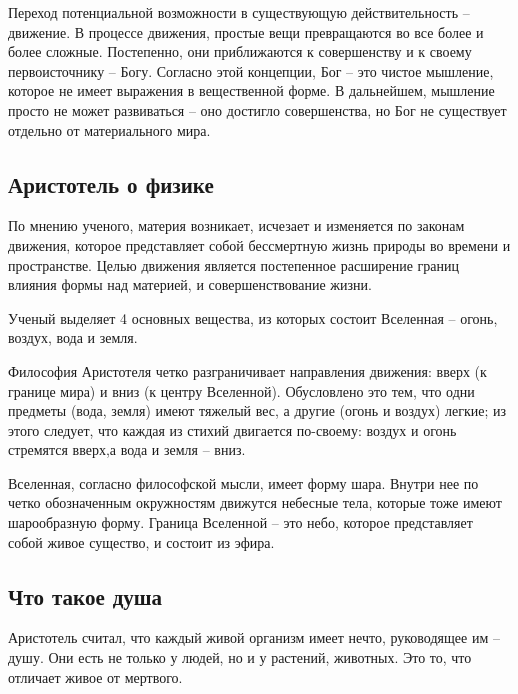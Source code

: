 \documentclass[
]{article}
\begin{document}
Переход потенциальной возможности в существующую действительность --
движение. В процессе движения, простые вещи превращаются во все более и
более сложные. Постепенно, они приближаются к совершенству и к своему
первоисточнику -- Богу. Согласно этой концепции, Бог -- это чистое
мышление, которое не имеет выражения в вещественной форме. В дальнейшем,
мышление просто не может развиваться -- оно достигло совершенства, но
Бог не существует отдельно от материального мира.

\hypertarget{ux430ux440ux438ux441ux442ux43eux442ux435ux43bux44c-ux43e-ux444ux438ux437ux438ux43aux435}{%
\subsection{Аристотель о
физике}\label{ux430ux440ux438ux441ux442ux43eux442ux435ux43bux44c-ux43e-ux444ux438ux437ux438ux43aux435}}

По мнению ученого, материя возникает, исчезает и изменяется по законам
движения, которое представляет собой бессмертную жизнь природы во
времени и пространстве. Целью движения является постепенное расширение
границ влияния формы над материей, и совершенствование жизни.

Ученый выделяет 4 основных вещества, из которых состоит Вселенная --
огонь, воздух, вода и земля.

Философия Аристотеля четко разграничивает направления движения: вверх (к
границе мира) и вниз (к центру Вселенной). Обусловлено это тем, что одни
предметы (вода, земля) имеют тяжелый вес, а другие (огонь и воздух)
легкие; из этого следует, что каждая из стихий двигается по-своему:
воздух и огонь стремятся вверх,а вода и земля -- вниз.

Вселенная, согласно философской мысли, имеет форму шара. Внутри нее по
четко обозначенным окружностям движутся небесные тела, которые тоже
имеют шарообразную форму. Граница Вселенной -- это небо, которое
представляет собой живое существо, и состоит из эфира.

\hypertarget{ux447ux442ux43e-ux442ux430ux43aux43eux435-ux434ux443ux448ux430-1}{%
\subsection{Что такое
душа}\label{ux447ux442ux43e-ux442ux430ux43aux43eux435-ux434ux443ux448ux430-1}}

Аристотель считал, что каждый живой организм имеет нечто, руководящее им
-- душу. Они есть не только у людей, но и у растений, животных. Это то,
что отличает живое от мертвого.
\end{document}
